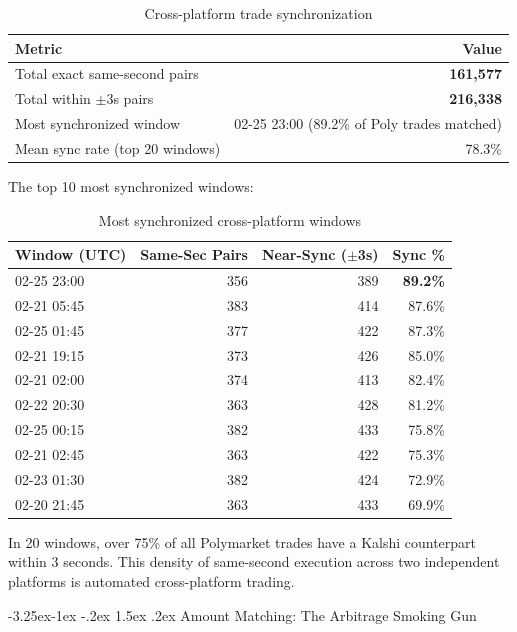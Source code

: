 \documentclass[11pt,a4paper]{article}
\makeatletter
\renewcommand\subsection{\@startsection{subsection}{2}{\z@}%
  {-3.25ex\@plus -1ex \@minus -.2ex}%
  {1.5ex \@plus .2ex}%
  {\normalfont\large\bfseries}}
\makeatother
\begin{document}
\begin{table}[H]
\centering
\caption{Cross-platform trade synchronization}
\label{tab:sync}
\begin{tabular}{@{}lr@{}}
\toprule
\textbf{Metric} & \textbf{Value} \\
\midrule
Total exact same-second pairs & \textbf{161,577} \\
Total within $\pm$3s pairs & \textbf{216,338} \\
Most synchronized window & 02-25 23:00 (89.2\% of Poly trades matched) \\
Mean sync rate (top 20 windows) & 78.3\% \\
\bottomrule
\end{tabular}
\end{table}

The top 10 most synchronized windows:

\begin{table}[H]
\centering
\caption{Most synchronized cross-platform windows}
\label{tab:sync_windows}
\small
\begin{tabular}{@{}lrrr@{}}
\toprule
\textbf{Window (UTC)} & \textbf{Same-Sec Pairs} & \textbf{Near-Sync ($\pm$3s)} & \textbf{Sync \%} \\
\midrule
02-25 23:00 & 356 & 389 & \textbf{89.2\%} \\
02-21 05:45 & 383 & 414 & 87.6\% \\
02-25 01:45 & 377 & 422 & 87.3\% \\
02-21 19:15 & 373 & 426 & 85.0\% \\
02-21 02:00 & 374 & 413 & 82.4\% \\
02-22 20:30 & 363 & 428 & 81.2\% \\
02-25 00:15 & 382 & 433 & 75.8\% \\
02-21 02:45 & 363 & 422 & 75.3\% \\
02-23 01:30 & 382 & 424 & 72.9\% \\
02-20 21:45 & 363 & 433 & 69.9\% \\
\bottomrule
\end{tabular}
\end{table}

In 20 windows, over 75\% of all Polymarket trades have a Kalshi counterpart within 3 seconds. This density of same-second execution across two independent platforms is automated cross-platform trading.

\subsection{Amount Matching: The Arbitrage Smoking Gun}
\end{document}

